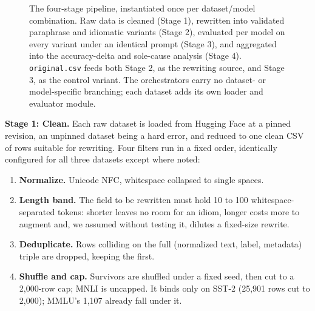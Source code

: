\documentclass{article}   %
\begin{document}
\begin{figure}[t]
\caption{The four-stage pipeline, instantiated once per dataset/model
combination. Raw data is cleaned (Stage 1), rewritten into validated
paraphrase and idiomatic variants (Stage 2), evaluated per model on every
variant under an identical prompt (Stage 3), and aggregated into the
accuracy-delta and sole-cause analysis (Stage 4). \texttt{original.csv} feeds
both Stage 2, as the rewriting source, and Stage 3, as the control variant.
The orchestrators carry no dataset- or model-specific branching; each dataset
adds its own loader and evaluator module.}
\label{fig:pipeline}
\end{figure}

\textbf{Stage 1: Clean.} Each raw dataset is loaded from Hugging Face at a
pinned revision, an unpinned dataset being a hard error, and reduced to one
clean CSV of rows suitable for rewriting. Four filters run in a fixed order,
identically configured for all three datasets except where noted:

\begin{enumerate}[leftmargin=1.3em]
\item \textbf{Normalize.} Unicode NFC, whitespace collapsed to single spaces.
\item \textbf{Length band.} The field to be rewritten must hold 10 to 100
      whitespace-separated tokens: shorter leaves no room for an idiom, longer
      costs more to augment and, we assumed without testing it, dilutes a
      fixed-size rewrite.
\item \textbf{Deduplicate.} Rows colliding on the full (normalized text, label,
      metadata) triple are dropped, keeping the first.
\item \textbf{Shuffle and cap.} Survivors are shuffled under a fixed seed, then
      cut to a 2{,}000-row cap; MNLI is uncapped. It binds only on SST-2
      (25{,}901 rows cut to 2{,}000); MMLU's 1{,}107 already fall under it.
\end{enumerate}
\end{document}
